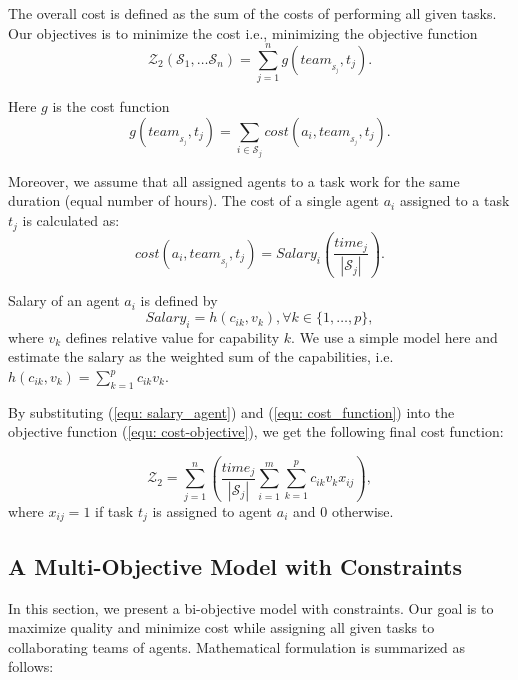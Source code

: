 \documentclass{sig-alternate}
\begin{document}
The overall cost is defined as the sum of the costs of performing all given 
tasks. 
Our objectives is to minimize the cost i.e., minimizing the objective function
\begin{equation}\label{equ: cost-objective}
\mathcal{Z}_2(\mathcal{S}_1, \dots \mathcal{S}_n) 
= \sum_{j=1}^n g({team_{_{\mathcal{S}_j}}, t_j}).
\end{equation}

Here $g$ is the cost function
\begin{equation}\label{equ: cost_function}
  g(team_{_{\mathcal{S}_j}}, t_j) = \sum_{i \in \mathcal{S}_j} 
  cost(a_i, team_{_{\mathcal{S}_j}}, t_j).
\end{equation}

Moreover, we assume that all assigned agents to a task work for the same 
duration (equal number of hours). The cost of a single agent $a_i$ assigned to 
a task $t_j$ is calculated as:
\begin{equation}\label{equ: cost_agent}
  cost(a_i, team_{_{\mathcal{S}_j}}, t_j) = Salary_i(\frac{time_j}{|\mathcal{S}_j|}).
\end{equation}

Salary of an agent $a_i$ is defined by
\begin{equation}\label{equ: salary_agent}
  Salary_i = h(c_{ik}, v_{k}), \forall k \in \{1, \dots, p\},
\end{equation}
where $v_{k}$ defines relative value for capability $k$. We use a simple model 
here and estimate the salary as the weighted sum of the capabilities, i.e. 
$h(c_{ik}, v_{k}) = \sum_{k=1}^p c_{ik} v_{k}.$ 

By substituting (\ref{equ: salary_agent}) 
and (\ref{equ: cost_function}) into the objective function 
(\ref{equ: cost-objective}), we get the following final cost function:

\begin{equation}\label{equ: final_cost_objective}
  \mathcal{Z}_2 = \sum_{j=1}^n (\frac{time_j}{|\mathcal{S}_j|} 
  \sum_{i=1}^m \sum_{k=1}^p c_{ik}v_{k}x_{ij}), 
\end{equation}
where \mbox{$x_{ij} = 1$} if task $t_j$ is assigned to agent $a_i$ 
and $0$ otherwise.


\subsection{A Multi-Objective Model with Constraints}
In this section, we present a bi-objective model with constraints. 
Our goal is to maximize quality and minimize cost while assigning all given 
tasks to collaborating teams of agents. Mathematical formulation is summarized 
as follows:
\end{document}
